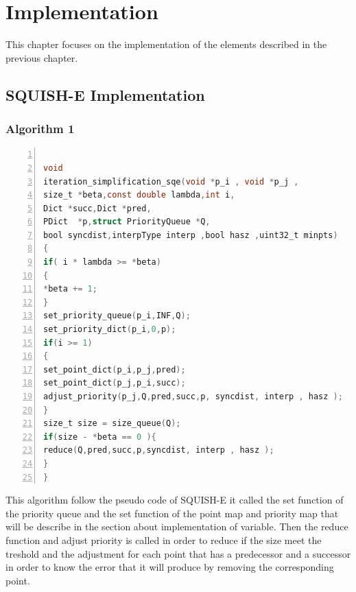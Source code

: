 
\chapter{Implementation}
This chapter focuses on the implementation of the elements described in the previous chapter.

\section{SQUISH-E Implementation}


\subsection{Algorithm 1}

\begin{lstlisting}[language=C, % Spécifie le langage du code
caption={SQUISH-E}, % Légende du listing
label=lst:squish_c, % Étiquette pour référencer le listing
numbers=left,
numberstyle=\tiny\color{gray},
stepnumber=1,
frame=single,
breaklines=true,
postbreak=\mbox{\textcolor{red}{$\hookrightarrow$}\space},
showstringspaces=false
]

void
iteration_simplification_sqe(void *p_i , void *p_j ,
size_t *beta,const double lambda,int i,
Dict *succ,Dict *pred,
PDict  *p,struct PriorityQueue *Q,
bool syncdist,interpType interp ,bool hasz ,uint32_t minpts)
{
if( i * lambda >= *beta)
{
*beta += 1;
}
set_priority_queue(p_i,INF,Q);
set_priority_dict(p_i,0,p);
if(i >= 1)
{
set_point_dict(p_i,p_j,pred);
set_point_dict(p_j,p_i,succ);
adjust_priority(p_j,Q,pred,succ,p, syncdist, interp , hasz );
}
size_t size = size_queue(Q);
if(size - *beta == 0 ){
reduce(Q,pred,succ,p,syncdist, interp , hasz );
}
}
\end{lstlisting}
\vspace{1cm}
This algorithm follow the pseudo code of SQUISH-E it called the set function of the priority queue and the set function of the point map and priority map that will be describe in the section about implementation of variable. Then the reduce function and adjust priority is called in order to reduce if the size meet the treshold and the adjustment for each point that has a predecessor and a successor in order to know the error that it will produce by removing the corresponding point.

